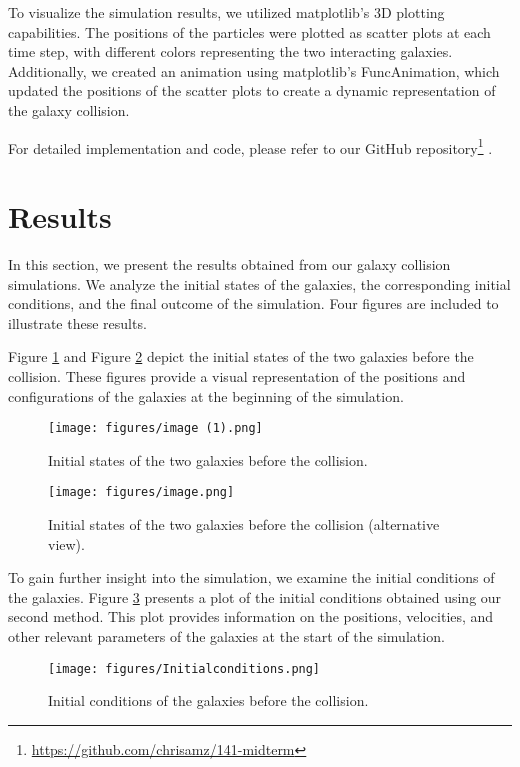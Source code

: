 \documentclass[reprint, amsmath, amssymb, aps]{revtex4-2}
\begin{document}
To visualize the simulation results, we utilized matplotlib's 3D plotting capabilities. The positions of the particles were plotted as scatter plots at each time step, with different colors representing the two interacting galaxies. Additionally, we created an animation using matplotlib's FuncAnimation, which updated the positions of the scatter plots to create a dynamic representation of the galaxy collision.

For detailed implementation and code, please refer to our GitHub repository\footnote{\url{https://github.com/chrisamz/141-midterm}} \cite{github}.

\section{Results}

In this section, we present the results obtained from our galaxy collision simulations. We analyze the initial states of the galaxies, the corresponding initial conditions, and the final outcome of the simulation. Four figures are included to illustrate these results.

Figure \ref{fig:initial1} and Figure \ref{fig:initial2} depict the initial states of the two galaxies before the collision. These figures provide a visual representation of the positions and configurations of the galaxies at the beginning of the simulation.

\begin{figure}[htb]
\centering
\texttt{[image: figures/image (1).png]}
\caption{Initial states of the two galaxies before the collision.}
\label{fig:initial1}
\end{figure}

\begin{figure}[htb]
\centering
\texttt{[image: figures/image.png]}
\caption{Initial states of the two galaxies before the collision (alternative view).}
\label{fig:initial2}
\end{figure}

To gain further insight into the simulation, we examine the initial conditions of the galaxies. Figure \ref{fig:init_conditions} presents a plot of the initial conditions obtained using our second method. This plot provides information on the positions, velocities, and other relevant parameters of the galaxies at the start of the simulation.

\begin{figure}[htb]
\centering
\texttt{[image: figures/Initialconditions.png]}
\caption{Initial conditions of the galaxies before the collision.}
\label{fig:init_conditions}
\end{figure}
\end{document}
